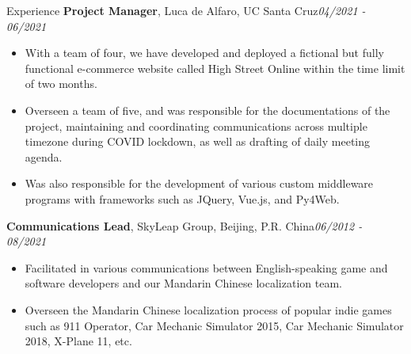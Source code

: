 \documentclass{resume} %
\begin{document}
\begin{rSection}{Experience}
\vspace{-0.2cm}
{\bf{Project Manager}}{, Luca de Alfaro, UC Santa Cruz}\hfill{\em 04/2021 - 06/2021}
\begin{itemize}
\vspace{-0.2cm}
\item With a team of four, we have developed and deployed a fictional but fully functional e-commerce website called High Street Online within the time limit of two months.
\vspace{-0.2cm}
\item Overseen a team of five, and was responsible for the documentations of the project, maintaining and coordinating communications across multiple timezone during COVID lockdown, as well as drafting of daily meeting agenda. 
\vspace{-0.2cm}
\item Was also responsible for the development of various custom middleware programs with frameworks such as JQuery, Vue.js, and Py4Web.
\end{itemize}

\vspace{-0.2cm}
{\bf{Communications Lead}}{, SkyLeap Group, Beijing, P.R. China}\hfill{\em06/2012 - 08/2021}
\begin{itemize}
\vspace{-0.2cm}
\item Facilitated in various communications between English-speaking game and software developers and our Mandarin Chinese localization team. 
\vspace{-0.2cm}
\item Overseen the Mandarin Chinese localization process of popular indie games such as 911 Operator, Car Mechanic Simulator 2015, Car Mechanic Simulator 2018, X-Plane 11, etc.
\end{itemize}

\end{rSection}
\end{document}
